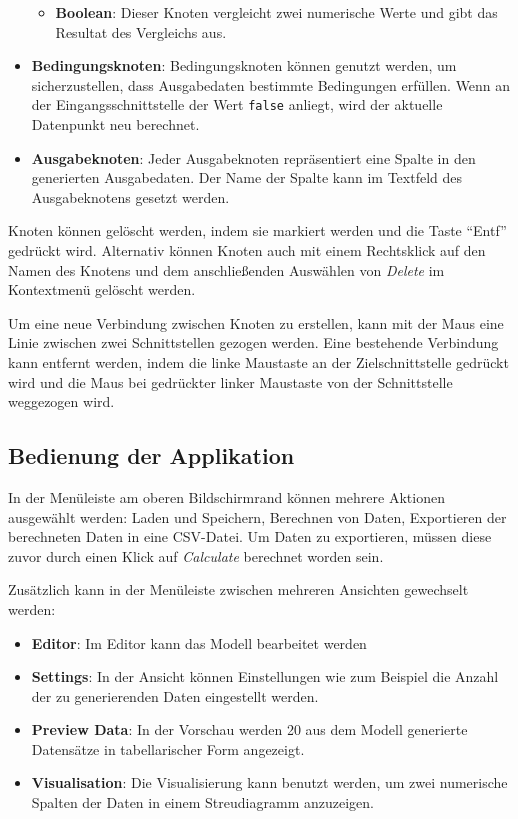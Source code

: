 \begin{itemize}
\begin{itemize}
        \item \textbf{Boolean}: Dieser Knoten vergleicht zwei numerische Werte und gibt das Resultat des Vergleichs aus.
    \end{itemize}
    \item \textbf{Bedingungsknoten}: Bedingungsknoten können genutzt werden, um sicherzustellen, dass Ausgabedaten bestimmte Bedingungen erfüllen. Wenn an der Eingangsschnittstelle der Wert \texttt{false} anliegt, wird der aktuelle Datenpunkt neu berechnet.
    \item \textbf{Ausgabeknoten}: Jeder Ausgabeknoten repräsentiert eine Spalte in den generierten Ausgabedaten. Der Name der Spalte kann im Textfeld des Ausgabeknotens gesetzt werden.
\end{itemize}

Knoten können gelöscht werden, indem sie markiert werden und die Taste \enquote{Entf} gedrückt wird. Alternativ können Knoten auch mit einem Rechtsklick auf den Namen des Knotens und dem anschließenden Auswählen von \textit{Delete} im Kontextmenü gelöscht werden.

Um eine neue Verbindung zwischen Knoten zu erstellen, kann mit der Maus eine Linie zwischen zwei Schnittstellen gezogen werden. Eine bestehende Verbindung kann entfernt werden, indem die linke Maustaste an der Zielschnittstelle gedrückt wird und die Maus bei gedrückter linker Maustaste von der Schnittstelle weggezogen wird.

\subsection*{Bedienung der Applikation}

In der Menüleiste am oberen Bildschirmrand können mehrere Aktionen ausgewählt werden: Laden und Speichern, Berechnen von Daten, Exportieren der berechneten Daten in eine CSV-Datei. Um Daten zu exportieren, müssen diese zuvor durch einen Klick auf \textit{Calculate} berechnet worden sein.

Zusätzlich kann in der Menüleiste zwischen mehreren Ansichten gewechselt werden:
\begin{itemize}
    \item \textbf{Editor}: Im Editor kann das Modell bearbeitet werden
    \item \textbf{Settings}: In der Ansicht können Einstellungen wie zum Beispiel die Anzahl der zu generierenden Daten eingestellt werden.
    \item \textbf{Preview Data}: In der Vorschau werden 20 aus dem Modell generierte Datensätze in tabellarischer Form angezeigt.
    \item \textbf{Visualisation}: Die Visualisierung kann benutzt werden, um zwei numerische Spalten der Daten in einem Streudiagramm anzuzeigen.
\end{itemize}